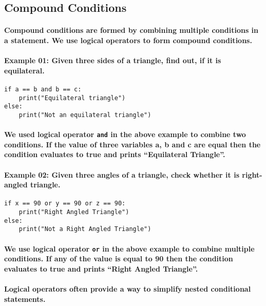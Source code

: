 \documentclass{book}
\begin{document}
\subsection*{Compound Conditions}
\paragraph{Compound conditions are formed by combining multiple conditions in a statement. We use logical
operators to form compound conditions.}

\paragraph{Example 01: Given three sides of a triangle, find out, if it is equilateral.}

\begin{verbatim}
if a == b and b == c:
    print("Equilateral triangle")
else:
    print("Not an equilateral triangle")
\end{verbatim}

\paragraph{We used logical operator \texttt{and} in the above example to combine two conditions. If the value of three variables a, b and c are equal then the condition evaluates to true and prints “Equilateral Triangle”.}

\paragraph{Example 02: Given three angles of a triangle,  check whether it is right-angled triangle.}

\begin{verbatim}
if x == 90 or y == 90 or z == 90:
    print("Right Angled Triangle")
else:
    print("Not a Right Angled Triangle")
\end{verbatim}

\paragraph{We use logical operator \texttt{or} in the above example to combine multiple conditions. If any of the value is equal to 90 then the condition evaluates to true and prints “Right Angled Triangle”.}

\paragraph{Logical operators often provide a way to simplify nested conditional statements.}
\end{document}
